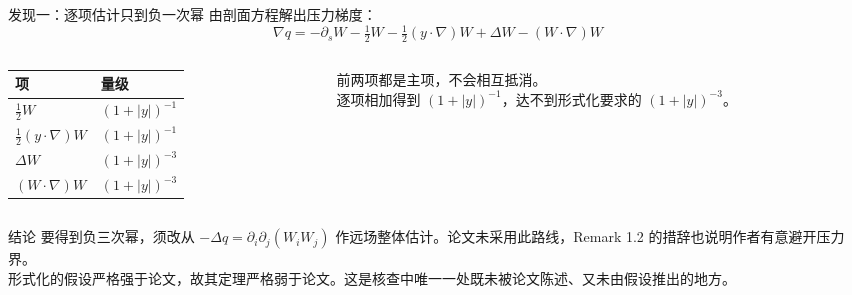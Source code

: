 \documentclass[aspectratio=169,11pt,fontset=windows]{ctexbeamer}
\newcommand{\abs}[1]{\left\lvert #1\right\rvert}
\begin{document}
\begin{frame}{发现一：逐项估计只到负一次幂}
  \small
  由剖面方程解出压力梯度：
  \[
    \nabla q=-\partial_sW-\tfrac12W-\tfrac12(y\cdot\nabla)W+\Delta W-(W\cdot\nabla)W
  \]

  \begin{columns}[T]
    \begin{column}{0.46\textwidth}
      \footnotesize
      \begin{tabular}{@{}ll@{}}
        \toprule
        项 & 量级 \\
        \midrule
        $\tfrac12W$ & $(1+\abs{y})^{-1}$ \\
        $\tfrac12(y\cdot\nabla)W$ & $(1+\abs{y})^{-1}$ \\
        $\Delta W$ & $(1+\abs{y})^{-3}$ \\
        $(W\cdot\nabla)W$ & $(1+\abs{y})^{-3}$ \\
        \bottomrule
      \end{tabular}
    \end{column}
    \begin{column}{0.50\textwidth}
      \footnotesize
      前两项都是主项，不会相互抵消。\\[3pt]
      逐项相加得到 $(1+\abs{y})^{-1}$，达不到形式化要求的 $(1+\abs{y})^{-3}$。
    \end{column}
  \end{columns}

  \vspace{2mm}
  \begin{alertblock}{结论}
    \footnotesize
    要得到负三次幂，须改从 $-\Delta q=\partial_i\partial_j(W_iW_j)$ 作远场整体估计。论文未采用此路线，Remark 1.2 的措辞也说明作者有意避开压力界。\\[2pt]
    形式化的假设严格强于论文，故其定理严格弱于论文。这是核查中唯一一处既未被论文陈述、又未由假设推出的地方。
  \end{alertblock}
\end{frame}
\end{document}
